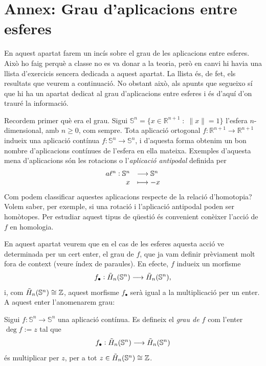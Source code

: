 \documentclass[../main.tex]{subfiles}
\begin{document}
\section{Annex: Grau d'aplicacions entre esferes}

En aquest apartat farem un incís sobre el grau de les aplicacions entre esferes. Això ho faig perquè a classe no es va donar a la teoria, però en canvi hi havia una llista d'exercicis sencera dedicada a aquest apartat. La llista és, de fet, els resultats que veurem a continuació. No obstant això, als apunts que segueixo sí que hi ha un apartat dedicat al grau d'aplicacions entre esferes i és d'aquí d'on trauré la informació.

Recordem primer què era el grau. Sigui $\mathbb{S}^n = \{x\in\mathbb{R}^{n+1}\;:\;\|x\|=1\}$ l'esfera $n$-dimensional, amb $n\geq 0$, com sempre. Tota aplicació ortogonal $f:\mathbb{R}^{n+1}\rightarrow\mathbb{R}^{n+1}$ indueix una aplicació contínua $f:\mathbb{S}^n\rightarrow\mathbb{S}^n$, i d'aquesta forma obtenim un bon nombre d'aplicacions contínues de l'esfera en ella mateixa. Exemples d'aquesta mena d'aplicacions són les rotacions o l'\textit{aplicació antipodal} definida per
\begin{equation}
    \notag
    \begin{array}{rl}
        a\ell^n: \mathbb{S}^n & \longrightarrow\mathbb{S}^n \\
        x & \longmapsto -x
    \end{array}
\end{equation}
Com podem classificar aquestes aplicacions respecte de la relació d'homotopia? Volem saber, per exemple, si una rotació i l'aplicació antipodal poden ser homòtopes. Per estudiar aquest tipus de qüestió és convenient conèixer l'acció de $f$ en homologia.

En aquest apartat veurem que en el cas de les esferes aquesta acció ve determinada per un cert enter, el grau de $f$, que ja vam definir prèviament molt fora de context (veure índex de paraules). En efecte, $f$ indueix un morfisme
\begin{equation}
    \notag
    f_\bullet:\Tilde{H}_n(\mathbb{S}^n)\longrightarrow\Tilde{H}_n(\mathbb{S}^n),
\end{equation}
i, com $\Tilde{H}_n(\mathbb{S}^n)\cong\mathbb{Z}$, aquest morfisme $f_\bullet$ serà igual a la multiplicació per un enter. A aquest enter l'anomenarem grau:

\begin{defi}
[Grau]\label{def:grau} Sigui $f:\mathbb{S}^n\rightarrow\mathbb{S}^n$ una aplicació contínua. Es defineix el \textit{grau de $f$} com l'enter $\deg f := z$ tal que
\begin{equation}
    \notag
    f_\bullet:\Tilde{H}_n(\mathbb{S}^n)\longrightarrow \Tilde{H}_n(\mathbb{S}^n)
\end{equation}
és multiplicar per $z$, per a tot $z\in\Tilde{H}_n(\mathbb{S}^n)\cong\mathbb{Z}$. 
\end{defi}
\end{document}
